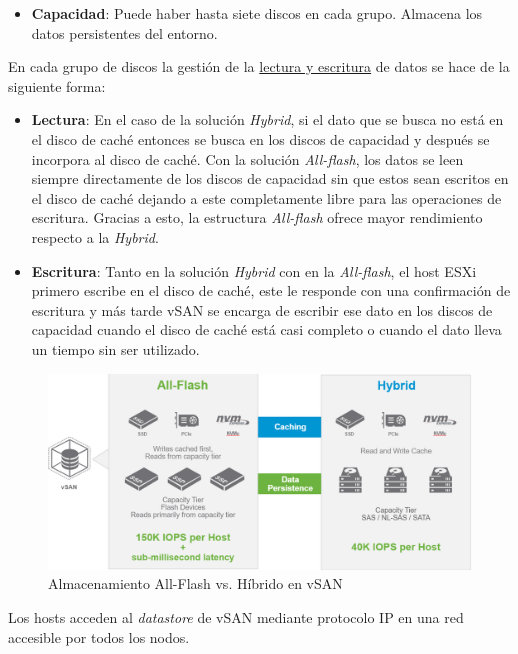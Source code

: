 \begin{itemize}
\begin{itemize}
            \item \textbf{Capacidad}: Puede haber hasta siete discos en cada grupo. Almacena los datos persistentes del entorno.
        \end{itemize}
    En cada grupo de discos la gestión de la \underline{lectura y escritura} de datos se hace de la siguiente forma:
        \begin{itemize}
            \item \textbf{Lectura}: En el caso de la solución \textit{Hybrid}, si el dato que se busca no está en el disco de caché entonces se busca en los discos de capacidad y después se incorpora al disco de caché. Con la solución \textit{All-flash}, los datos se leen siempre directamente de los discos de capacidad sin que estos sean escritos en el disco de caché dejando a este completamente libre para las operaciones de escritura. Gracias a esto, la estructura \textit{All-flash} ofrece mayor rendimiento respecto a la \textit{Hybrid}.
            \item \textbf{Escritura}: Tanto en la solución \textit{Hybrid} con en la \textit{All-flash}, el host ESXi primero escribe en el disco de caché, este le responde con una confirmación de escritura y más tarde vSAN se encarga de escribir ese dato en los discos de capacidad cuando el disco de caché está casi completo o cuando el dato lleva un tiempo sin ser utilizado.
        \end{itemize}
        \begin{figure}[h!]
            \centering
            \includegraphics[width=1\textwidth]{imaxes/cap2recursos/rendimientoVSAN.png}
            \caption{Almacenamiento All-Flash vs. Híbrido en vSAN}
            \label{fig:rendimientoVSAN}
        \end{figure}
        \FloatBarrier
    Los hosts acceden al \textit{datastore} de vSAN mediante protocolo IP en una red accesible por todos los nodos. \\ 

\end{itemize}
